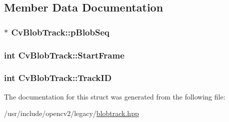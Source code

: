 \subsection{Member Data Documentation}
\hypertarget{structCvBlobTrack_a713e6659dc983db58adddb5c902b5c9d}{
\subsubsection[{p\-Blob\-Seq}]{$\ast$ Cv\-Blob\-Track\-::p\-Blob\-Seq}}\label{structCvBlobTrack_a713e6659dc983db58adddb5c902b5c9d}
\hypertarget{structCvBlobTrack_aa97587940f8f77b8cbeb3592efb57ebf}{
\subsubsection[{Start\-Frame}]{\setlength{\rightskip}{0pt plus 5cm}int Cv\-Blob\-Track\-::\-Start\-Frame}}\label{structCvBlobTrack_aa97587940f8f77b8cbeb3592efb57ebf}
\hypertarget{structCvBlobTrack_a3a52923de9b3558457416d5ec178a4c7}{
\subsubsection[{Track\-I\-D}]{\setlength{\rightskip}{0pt plus 5cm}int Cv\-Blob\-Track\-::\-Track\-I\-D}}\label{structCvBlobTrack_a3a52923de9b3558457416d5ec178a4c7}


The documentation for this struct was generated from the following file\-:\begin{DoxyCompactItemize}
\item 
/usr/include/opencv2/legacy/\hyperlink{blobtrack_8hpp}{blobtrack.\-hpp}\end{DoxyCompactItemize}
